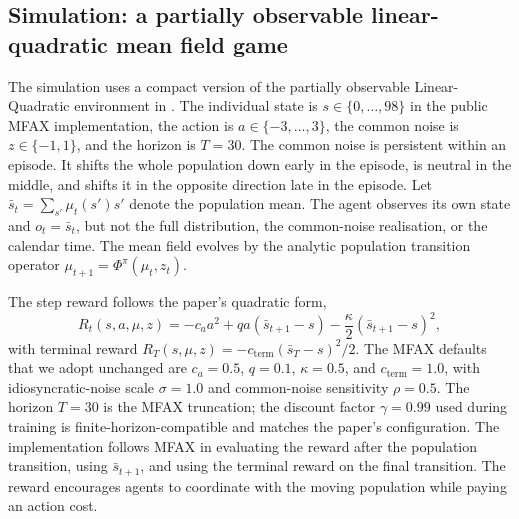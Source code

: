 \subsection{Simulation: a partially observable linear-quadratic mean field game}
\label{sec:macro:mfg_sim}

The simulation uses a compact version of the partially observable
Linear-Quadratic environment in
\citet{Wibault2026rspg}. The individual state is
$s \in \{0,\ldots,98\}$ in the public MFAX implementation, the action
is $a \in \{-3,\ldots,3\}$, the common noise is
$z \in \{-1,1\}$, and the horizon is $T = 30$. The common noise is
persistent within an episode. It shifts the whole population down
early in the episode, is neutral in the middle, and shifts it in the
opposite direction late in the episode. Let
$\bar{s}_t = \sum_{s'} \mu_t(s')s'$ denote the population mean. The
agent observes its own state and $o_t = \bar{s}_t$, but not the full
distribution, the common-noise realisation, or the calendar time. The
mean field evolves by the analytic population transition operator
$\mu_{t+1} = \Phi^{\pi}(\mu_t,z_t)$.

The step reward follows the paper's quadratic form,
\begin{equation}
R_t(s,a,\mu,z)
= -c_a a^2 + q a(\bar{s}_{t+1} - s)
  - \frac{\kappa}{2}(\bar{s}_{t+1} - s)^2,
\label{eq:macro:lqmfg-reward}
\end{equation}
with terminal reward
$R_T(s,\mu,z) = -c_{\mathrm{term}}(\bar{s}_T - s)^2/2$.
The MFAX defaults that we adopt unchanged are $c_a = 0.5$, $q = 0.1$,
$\kappa = 0.5$, and $c_{\mathrm{term}} = 1.0$, with idiosyncratic-noise
scale $\sigma = 1.0$ and common-noise sensitivity $\rho = 0.5$. The
horizon $T = 30$ is the MFAX truncation; the discount factor
$\gamma = 0.99$ used during training is finite-horizon-compatible and
matches the paper's configuration. The implementation follows MFAX in
evaluating the reward after the population transition, using
$\bar{s}_{t+1}$, and using the terminal reward on the final
transition. The reward encourages agents to coordinate with the moving
population while paying an action cost.

